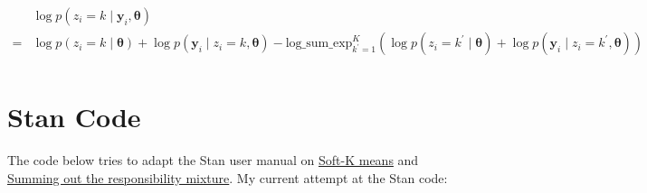 \documentclass[12pt,letterpaper]{article}
\numberwithin{equation}{section}
\newcommand{\bth}{\bm{\theta}}
\newcommand{\by}{\mathbf{y}}
\begin{document}
\begin{align*}
&\log p(z_i = k \mid \by_{i}, \bth)\\
=& \log p(z_i = k \mid \bth) + \log p(\by_i \mid z_i = k,  \bth)   - \mathrm{log\_sum\_exp}_{k^\prime = 1}^K\left(\log p(z_i = k^\prime \mid \bth) + \log p(\by_i \mid z_i = k^\prime, \bth)\right)\\
\end{align*}

\pagebreak

\section{Stan Code}

The code below tries to adapt the Stan user manual on
\href{https://mc-stan.org/docs/2_20/stan-users-guide/soft-k-means.html}{Soft-K
means} and
\href{https://mc-stan.org/docs/2_20/stan-users-guide/summing-out-the-responsibility-parameter.html}{Summing
out the responsibility mixture}. My current attempt at the Stan code:
\end{document}
